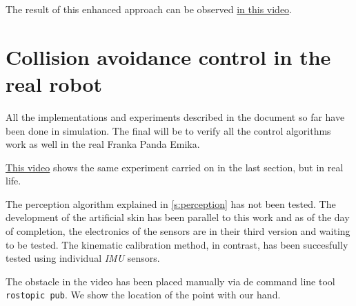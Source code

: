 The result of this enhanced approach can be observed \href{https://www.youtube.com/watch?v=iOytgdoOnlA&list=PLnhdDYfKdsgimnQTQO-bmtKj-KRdbvGgS&index=8&t=0s}{in this video}.

\section{Collision avoidance control in the real robot}

All the implementations and experiments described in the document so far have been done in simulation. The final will be to verify all the control algorithms work as well in the real Franka Panda Emika.

\href{https://www.youtube.com/watch?v=w5qdT06HPiU&list=PLnhdDYfKdsgimnQTQO-bmtKj-KRdbvGgS&index=8}{This video} shows the same experiment carried on in the last section, but in real life.

The perception algorithm explained in \ref{s:perception} has not been tested. The development of the artificial skin has been parallel to this work and as of the day of completion, the electronics of the sensors are in their third version and waiting to be tested. The kinematic calibration method, in contrast, has been succesfully tested using individual \textit{IMU} sensors.

The obstacle in the video has been placed manually via de command line tool \lstinline{rostopic pub}. We show the location of the point with our hand.